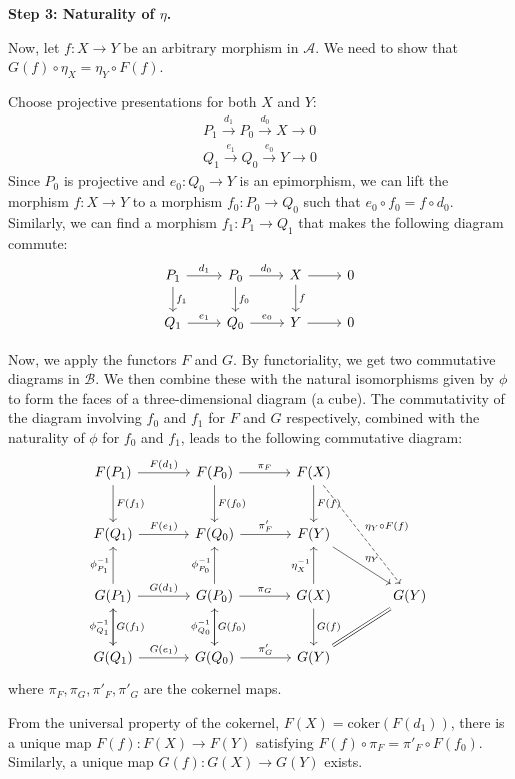 \documentclass[11pt]{article}
\theoremstyle{definition}
\begin{document}
\textbf{Step 3: Naturality of $\eta$.}

Now, let $f: X \to Y$ be an arbitrary morphism in $\mathcal{A}$. We need to show that $G(f) \circ \eta_X = \eta_Y \circ F(f)$.

Choose projective presentations for both $X$ and $Y$:
\begin{align*}
P_1 \xrightarrow{d_1} P_0 \xrightarrow{d_0} X \to 0 \\
Q_1 \xrightarrow{e_1} Q_0 \xrightarrow{e_0} Y \to 0
\end{align*}
Since $P_0$ is projective and $e_0: Q_0 \to Y$ is an epimorphism, we can lift the morphism $f: X \to Y$ to a morphism $f_0: P_0 \to Q_0$ such that $e_0 \circ f_0 = f \circ d_0$. Similarly, we can find a morphism $f_1: P_1 \to Q_1$ that makes the following diagram commute:
\[
\begin{tikzcd}
P_1 \arrow{r}{d_1} \arrow{d}{f_1} & P_0 \arrow{r}{d_0} \arrow{d}{f_0} & X \arrow{d}{f} \arrow{r} & 0 \\
Q_1 \arrow{r}{e_1} & Q_0 \arrow{r}{e_0} & Y \arrow{r} & 0
\end{tikzcd}
\]

Now, we apply the functors $F$ and $G$. By functoriality, we get two commutative diagrams in $\mathcal{B}$. We then combine these with the natural isomorphisms given by $\phi$ to form the faces of a three-dimensional diagram (a cube). The commutativity of the diagram involving $f_0$ and $f_1$ for $F$ and $G$ respectively, combined with the naturality of $\phi$ for $f_0$ and $f_1$, leads to the following commutative diagram:
\[
\begin{tikzcd}[column sep=large, row sep=large]
F(P_1) \arrow{r}{F(d_1)} \arrow{d}{F(f_1)} & F(P_0) \arrow{r}{\pi_F} \arrow{d}{F(f_0)} & F(X) \arrow{d}{F(f)} \arrow[dashed]{ddr}{\eta_Y \circ F(f)} & \\
F(Q_1) \arrow{r}{F(e_1)} & F(Q_0) \arrow{r}{\pi'_F} & F(Y) \arrow{dr}{\eta_Y} & \\
G(P_1) \arrow{r}{G(d_1)} \arrow{u}{\phi_{P_1}^{-1}} \arrow{d}{G(f_1)} & G(P_0) \arrow{r}{\pi_G} \arrow{u}{\phi_{P_0}^{-1}} \arrow{d}{G(f_0)} & G(X) \arrow{u}{\eta_X^{-1}} \arrow{d}{G(f)} & G(Y) \\
G(Q_1) \arrow{r}{G(e_1)} \arrow{u}{\phi_{Q_1}^{-1}} & G(Q_0) \arrow{r}{\pi'_G} \arrow{u}{\phi_{Q_0}^{-1}} & G(Y) \arrow[equal]{ur} &
\end{tikzcd}
\]
where $\pi_F, \pi_G, \pi'_F, \pi'_G$ are the cokernel maps.

From the universal property of the cokernel, $F(X) = \text{coker}(F(d_1))$, there is a unique map $F(f): F(X) \to F(Y)$ satisfying $F(f) \circ \pi_F = \pi'_F \circ F(f_0)$. Similarly, a unique map $G(f): G(X) \to G(Y)$ exists.
\end{document}
